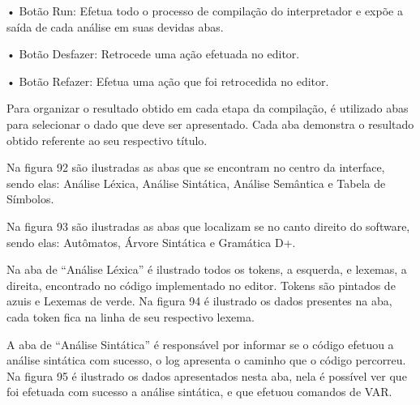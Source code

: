 \documentclass[12pt,oneside,a4paper,chapter=TITLE,section=TITLE,sumario=tradicional]{abntex2}
\begin{document}
•	Botão Run: Efetua todo o processo de compilação do interpretador e expõe a saída de cada análise em suas devidas abas.

•	Botão Desfazer: Retrocede uma ação efetuada no editor.

•	Botão Refazer: Efetua uma ação que foi retrocedida no editor.

\begin{figure}[H]
\end{figure}

Para organizar o resultado obtido em cada etapa da compilação, é utilizado abas para selecionar o dado que deve ser apresentado. Cada aba demonstra o resultado obtido referente ao seu respectivo título. 

Na figura 92 são ilustradas as abas que se encontram no centro da interface, sendo elas: Análise Léxica, Análise Sintática, Análise Semântica e Tabela de Símbolos.

\begin{figure}[H]
\end{figure}

Na figura 93 são ilustradas as abas que localizam se no canto direito do software, sendo elas: Autômatos, Árvore Sintática e Gramática D+.

\begin{figure}[H]
\end{figure}

Na aba de “Análise Léxica” é ilustrado todos os tokens, a esquerda, e lexemas, a direita, encontrado no código implementado no editor. Tokens são pintados de azuis e Lexemas de verde. Na figura 94 é ilustrado os dados presentes na aba, cada token fica na linha de seu respectivo lexema.

\begin{figure}[H]
\end{figure}

A aba de “Análise Sintática” é responsável por informar se o código efetuou a análise sintática com sucesso, o log apresenta o caminho que o código percorreu. Na figura 95 é ilustrado os dados apresentados nesta aba, nela é possível ver que foi efetuada com sucesso a análise sintática, e que efetuou comandos de VAR.
\end{document}
